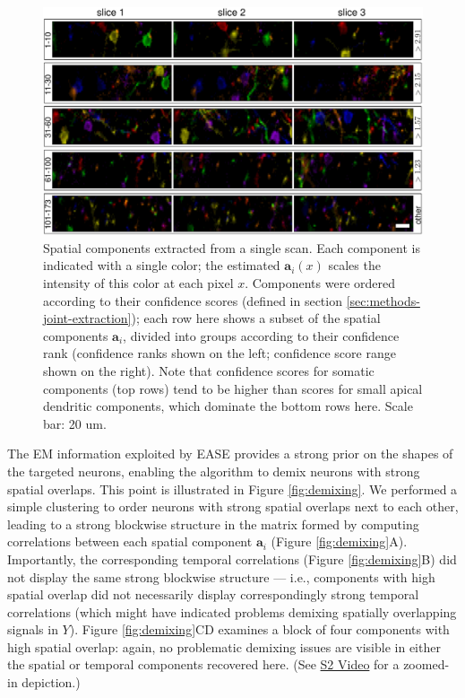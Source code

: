 \documentclass[10pt,letterpaper]{article}
\def \videoTwoURL{https://www.dropbox.com/s/jmkedq2f3nniy0a/demixing_example.avi?dl=0}
\begin{document}
\begin{figure}[t!]
	\centering
	\includegraphics[width=1\textwidth]{Figs/fig_overlap_A.pdf}
	\caption{Spatial components extracted from a single scan.  Each component is indicated with a single color; the estimated $\bm{a}_i(x)$ scales the intensity of this color at each pixel $x$.  Components were ordered according to their confidence scores (defined in section \ref{sec:methods-joint-extraction}); each row here shows a subset of the spatial components $\bm{a}_i$, divided into groups according to their confidence rank (confidence ranks shown on the left; confidence score range shown on the right).  Note that confidence scores for somatic components (top rows) tend to be higher than scores for small apical dendritic components, which dominate the bottom rows here. Scale bar: 20 um. }
\label{fig:overlap}
\end{figure}


The EM information exploited by EASE provides a strong prior on the shapes of the targeted neurons, enabling the algorithm to demix neurons with strong spatial overlaps.  This point is illustrated in Figure \ref{fig:demixing}.  We performed a simple clustering to order neurons with strong spatial overlaps next to each other, leading to a strong blockwise structure in the matrix formed by computing correlations between each spatial component $\bm{a}_i$ (Figure \ref{fig:demixing}A).  Importantly, the corresponding temporal correlations (Figure \ref{fig:demixing}B) did not display the same strong blockwise structure --- i.e., components with high spatial overlap did not necessarily display correspondingly strong temporal correlations (which might have indicated problems demixing spatially overlapping signals in $Y$).  Figure \ref{fig:demixing}CD examines a block of four components with high spatial overlap: again, no problematic demixing issues are visible in either the spatial or temporal components recovered here. (See \href{\videoTwoURL}{S2 Video} for a zoomed-in depiction.) 
\end{document}
